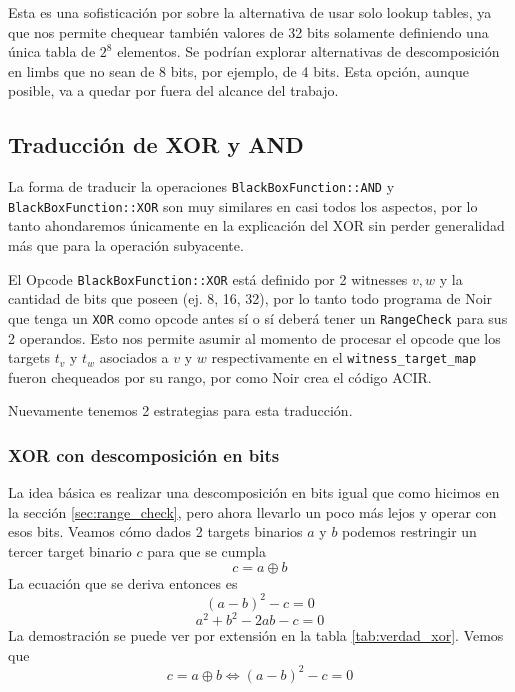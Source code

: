 Esta es una sofisticación por sobre la alternativa de usar solo lookup tables, ya que nos permite chequear también valores de 32 bits solamente definiendo una única tabla de $2^8$ elementos. Se podrían explorar alternativas de descomposición en limbs que no sean de 8 bits, por ejemplo, de 4 bits. Esta opción, aunque posible, va a quedar por fuera del alcance del trabajo. 

\subsection{Traducción de XOR y AND}\label{sec:traduccion_xor}
La forma de traducir la operaciones \texttt{BlackBoxFunction::AND} y \texttt{BlackBoxFunction::XOR} son muy similares en casi todos los aspectos, por lo tanto ahondaremos únicamente en la explicación del XOR sin perder generalidad más que para la operación subyacente. 

El Opcode \texttt{BlackBoxFunction::XOR} está definido por 2 witnesses $v,w$ y la cantidad de bits que poseen (ej. 8, 16, 32), por lo tanto todo programa de Noir que tenga un \texttt{XOR} como opcode antes sí o sí deberá tener un \texttt{RangeCheck} para sus 2 operandos. Esto nos permite asumir al momento de procesar el opcode que los targets $t_v$ y $t_w$ asociados a $v$ y $w$ respectivamente en el \texttt{witness\_target\_map} fueron chequeados por su rango, por como Noir crea el código ACIR.

Nuevamente tenemos 2 estrategias para esta traducción.

\subsubsection{\textbf{XOR con descomposición en bits}}
La idea básica es realizar una descomposición en bits igual que como hicimos en la sección \ref{sec:range_check}, pero ahora llevarlo un poco más lejos y operar con esos bits. Veamos cómo dados 2 targets binarios $a$ y $b$ podemos restringir un tercer target binario $c$ para que se cumpla
$$c = a \oplus b$$
La ecuación que se deriva entonces es 
$$(a-b)^2-c = 0$$
$$a^2 + b^2 -2ab -c = 0$$
La demostración se puede ver por extensión en la tabla \ref{tab:verdad_xor}. Vemos que 
$$c = a \oplus b \Leftrightarrow (a-b)^2-c = 0$$

